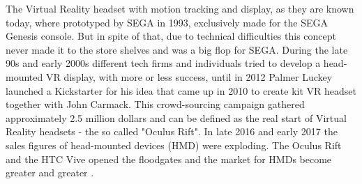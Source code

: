 \documentclass{report}
\begin{document}
			The Virtual Reality headset with motion tracking and display, as they are known today, where prototyped by SEGA in 1993, exclusively made for the SEGA Genesis console. But in spite of that, due to technical difficulties this concept never made it to the store shelves and was a big flop for SEGA. During the late 90s and early 2000s different tech firms and individuals tried to develop a head-mounted VR display, with more or less success, until in 2012 Palmer Luckey launched a Kickstarter for his idea that came up in 2010 to create kit VR headset together with John Carmack. This crowd-sourcing campaign gathered approximately 2.5 million dollars and can be defined as the real start of Virtual Reality headsets - the so called "Oculus Rift". In late 2016 and early 2017 the sales figures of head-mounted devices (HMD) were exploding. The Oculus Rift and the HTC Vive opened the floodgates and the market for HMDs become greater and greater \cite{VRHistory}.
		\closesection
\end{document}
